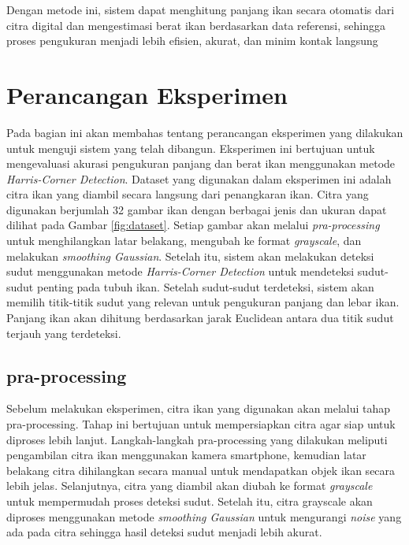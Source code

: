     Dengan metode ini, sistem dapat menghitung panjang ikan secara otomatis dari citra digital dan mengestimasi berat ikan berdasarkan data referensi, sehingga proses pengukuran menjadi lebih efisien, akurat, dan minim kontak langsung

\section{Perancangan Eksperimen}
   Pada bagian ini akan membahas tentang perancangan eksperimen yang dilakukan untuk menguji sistem yang telah dibangun. Eksperimen ini bertujuan untuk mengevaluasi akurasi pengukuran panjang dan berat ikan menggunakan metode \emph{Harris-Corner Detection}.
   Dataset yang digunakan dalam eksperimen ini adalah citra ikan yang diambil secara langsung dari penangkaran ikan.
   Citra yang digunakan berjumlah 32 gambar ikan dengan berbagai jenis dan ukuran dapat dilihat pada Gambar \ref{fig:dataset}.
   Setiap gambar akan melalui \emph{pra-processing} untuk menghilangkan latar belakang, mengubah ke format \emph{grayscale}, dan melakukan \emph{smoothing Gaussian}.
   Setelah itu, sistem akan melakukan deteksi sudut menggunakan metode \emph{Harris-Corner Detection} untuk mendeteksi sudut-sudut penting pada tubuh ikan.
   Setelah sudut-sudut terdeteksi, sistem akan memilih titik-titik sudut yang relevan untuk pengukuran panjang dan lebar ikan.
   Panjang ikan akan dihitung berdasarkan jarak Euclidean antara dua titik sudut terjauh yang terdeteksi.
    
\subsection{pra-processing}
    Sebelum melakukan eksperimen, citra ikan yang digunakan akan melalui tahap pra-processing. 
Tahap ini bertujuan untuk mempersiapkan citra agar siap untuk diproses lebih lanjut. 
Langkah-langkah pra-processing yang dilakukan meliputi pengambilan citra ikan menggunakan kamera smartphone, kemudian latar belakang citra dihilangkan secara manual untuk mendapatkan objek ikan secara lebih jelas. 
Selanjutnya, citra yang diambil akan diubah ke format \emph{grayscale} untuk mempermudah proses deteksi sudut. 
Setelah itu, citra grayscale akan diproses menggunakan metode \emph{smoothing Gaussian} untuk mengurangi \emph{noise} yang ada pada citra sehingga hasil deteksi sudut menjadi lebih akurat.

